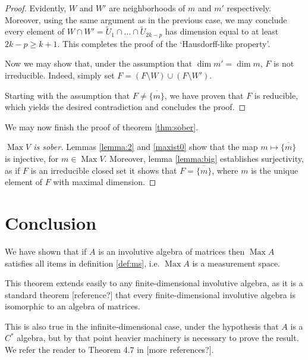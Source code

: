 \documentclass{article}
\theoremstyle{plain}
\theoremstyle{nonumberplain}
\newtheorem{proof}{Proof}
\DeclareMathOperator{\Max}{Max}
\begin{document}
\begin{proof}
Evidently, $W$ and $W'$ are neighborhoods of $m$ and $m'$ respectively. Moreover, using the same argument as in the previous case, we may conclude every element of $W \cap W' = \tilde U_1 \cap \dots \cap \tilde U_{2k-p}$ has dimension equal to at least $2k-p \geq k+1$. This completes the proof of the `Hausdorff-like property'.

Now we may show that, under the assumption that $\dim m' = \dim m$, $F$ is not irreducible. Indeed, simply set $F = (F \setminus W) \cup (F \setminus W')$.

\medskip

Starting with the assumption that $F \neq \overline{\{m\}}$, we have proven that $F$ is reducible, which yields the desired contradiction and concludes the proof.
\end{proof}

We may now finish the proof of theorem \ref{thm:sober}.

\begin{proof}[$\Max V$ is sober]
Lemmas \ref{lemma:2} and \ref{maxist0} show that the map $m \mapsto \overline{\{m\}}$ is injective, for $m \in \Max V$. Moreover, lemma \ref{lemma:big} establishes surjectivity, as if $F$ is an irreducible closed set it shows that $F = \overline{\{m\}}$, where $m$ is the unique element of $F$ with maximal dimension.
\end{proof}

\section{Conclusion}

We have shown that if $A$ is an involutive algebra of matrices then $\Max A$ satisfies all items in definition \ref{def:ms}, i.e. $\Max A$ is a measurement space.

This theorem extends easily to any finite-dimensional involutive algebra, as it is a standard theorem [reference?] that every finite-dimensional involutive algebra is isomorphic to an algebra of matrices.

This is also true in the infinite-dimensional case, under the hypothesis that $A$ is a $C^*$ algebra, but by that point heavier machinery is necessary to prove the result. We refer the reader to Theorem 4.7 in \cite{measurement2} [more references?].

\nocite{measurement}

{}

\end{document}
